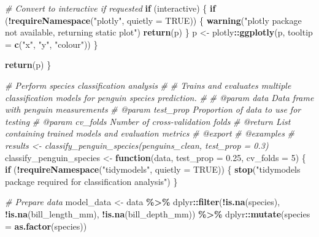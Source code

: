 \documentclass[
]{article}
\newenvironment{Shaded}{\begin{snugshade}}{\end{snugshade}}
\newcommand{\AttributeTok}[1]{\textcolor[rgb]{0.13,0.29,0.53}{#1}}
\newcommand{\CommentTok}[1]{\textcolor[rgb]{0.56,0.35,0.01}{\textit{#1}}}
\newcommand{\ConstantTok}[1]{\textcolor[rgb]{0.56,0.35,0.01}{#1}}
\newcommand{\ControlFlowTok}[1]{\textcolor[rgb]{0.13,0.29,0.53}{\textbf{#1}}}
\newcommand{\DecValTok}[1]{\textcolor[rgb]{0.00,0.00,0.81}{#1}}
\newcommand{\FloatTok}[1]{\textcolor[rgb]{0.00,0.00,0.81}{#1}}
\newcommand{\FunctionTok}[1]{\textcolor[rgb]{0.13,0.29,0.53}{\textbf{#1}}}
\newcommand{\NormalTok}[1]{#1}
\newcommand{\OtherTok}[1]{\textcolor[rgb]{0.56,0.35,0.01}{#1}}
\newcommand{\SpecialCharTok}[1]{\textcolor[rgb]{0.81,0.36,0.00}{\textbf{#1}}}
\newcommand{\StringTok}[1]{\textcolor[rgb]{0.31,0.60,0.02}{#1}}
\begin{document}
\begin{Shaded}
\begin{Highlighting}[]
  \CommentTok{\# Convert to interactive if requested}
  \ControlFlowTok{if}\NormalTok{ (interactive) \{}
    \ControlFlowTok{if}\NormalTok{ (}\SpecialCharTok{!}\FunctionTok{requireNamespace}\NormalTok{(}\StringTok{"plotly"}\NormalTok{, }\AttributeTok{quietly =} \ConstantTok{TRUE}\NormalTok{)) \{}
      \FunctionTok{warning}\NormalTok{(}\StringTok{"plotly package not available, returning static plot"}\NormalTok{)}
      \FunctionTok{return}\NormalTok{(p)}
\NormalTok{    \}}
\NormalTok{    p }\OtherTok{\textless{}{-}}\NormalTok{ plotly}\SpecialCharTok{::}\FunctionTok{ggplotly}\NormalTok{(p, }\AttributeTok{tooltip =} \FunctionTok{c}\NormalTok{(}\StringTok{"x"}\NormalTok{, }\StringTok{"y"}\NormalTok{, }\StringTok{"colour"}\NormalTok{))}
\NormalTok{  \}}

  \FunctionTok{return}\NormalTok{(p)}
\NormalTok{\}}

\CommentTok{\#\textquotesingle{} Perform species classification analysis}
\CommentTok{\#\textquotesingle{}}
\CommentTok{\#\textquotesingle{} Trains and evaluates multiple classification models for penguin species prediction.}
\CommentTok{\#\textquotesingle{}}
\CommentTok{\#\textquotesingle{} @param data Data frame with penguin measurements}
\CommentTok{\#\textquotesingle{} @param test\_prop Proportion of data to use for testing}
\CommentTok{\#\textquotesingle{} @param cv\_folds Number of cross{-}validation folds}
\CommentTok{\#\textquotesingle{} @return List containing trained models and evaluation metrics}
\CommentTok{\#\textquotesingle{} @export}
\CommentTok{\#\textquotesingle{} @examples}
\CommentTok{\#\textquotesingle{} results \textless{}{-} classify\_penguin\_species(penguins\_clean, test\_prop = 0.3)}
\NormalTok{classify\_penguin\_species }\OtherTok{\textless{}{-}} \ControlFlowTok{function}\NormalTok{(data, }\AttributeTok{test\_prop =} \FloatTok{0.25}\NormalTok{, }\AttributeTok{cv\_folds =} \DecValTok{5}\NormalTok{) \{}
  \ControlFlowTok{if}\NormalTok{ (}\SpecialCharTok{!}\FunctionTok{requireNamespace}\NormalTok{(}\StringTok{"tidymodels"}\NormalTok{, }\AttributeTok{quietly =} \ConstantTok{TRUE}\NormalTok{)) \{}
    \FunctionTok{stop}\NormalTok{(}\StringTok{"tidymodels package required for classification analysis"}\NormalTok{)}
\NormalTok{  \}}

  \CommentTok{\# Prepare data}
\NormalTok{  model\_data }\OtherTok{\textless{}{-}}\NormalTok{ data }\SpecialCharTok{\%\textgreater{}\%}
\NormalTok{    dplyr}\SpecialCharTok{::}\FunctionTok{filter}\NormalTok{(}\SpecialCharTok{!}\FunctionTok{is.na}\NormalTok{(species), }\SpecialCharTok{!}\FunctionTok{is.na}\NormalTok{(bill\_length\_mm), }\SpecialCharTok{!}\FunctionTok{is.na}\NormalTok{(bill\_depth\_mm)) }\SpecialCharTok{\%\textgreater{}\%}
\NormalTok{    dplyr}\SpecialCharTok{::}\FunctionTok{mutate}\NormalTok{(}\AttributeTok{species =} \FunctionTok{as.factor}\NormalTok{(species))}


\end{Highlighting}
\end{Shaded}
\end{document}
